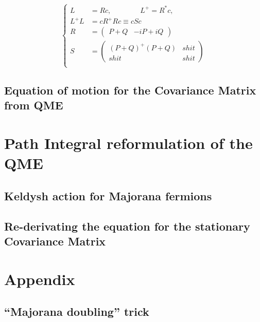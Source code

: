 \documentclass[a4paper,11pt]{article}
\begin{document}
\begin{equation}
\label{eq:quadr_lindb_majorana}
\left\{ 
 \begin{aligned}
    L    &= Rc, \quad \quad \quad \quad  L^+  = R^*c,\\
    L^+L &= cR^+Rc \equiv cSc \\
    R &= \left(\begin{array}{cc} P+Q & -iP+iQ\end{array}\right) \\
    S &  =\left(\begin{array}{cc} (P+Q)^+(P+Q) & shit\\shit&shit \end{array}\right)\\
 \end{aligned}
\right.
\end{equation}
  

  
  
  \subsection{Equation of motion for the Covariance Matrix from QME}
 \section{Path Integral reformulation of the QME}
  \subsection{Keldysh action for Majorana fermions}
  \subsection{Re-derivating the equation for the stationary Covariance Matrix}

  \appendix
  \section*{Appendix}
    \renewcommand{\thesection}{A}
    \subsection{``Majorana doubling'' trick}
    \label{sec:majo_doubling_theory}
    
   
   
{}
  
\end{document}
